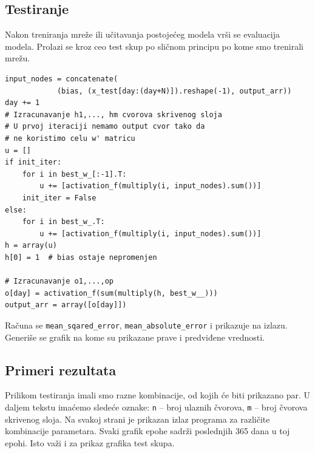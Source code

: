 \documentclass[a4paper]{article}
\begin{document}
\subsection{Testiranje}
Nakon treniranja mreže ili učitavanja postojećeg modela vrši se evaluacija modela. Prolazi se kroz ceo test skup po sličnom principu po kome smo trenirali mrežu.
\begin{verbatim}
input_nodes = concatenate(
            (bias, (x_test[day:(day+N)]).reshape(-1), output_arr))
day += 1
# Izracunavanje h1,..., hm cvorova skrivenog sloja
# U prvoj iteraciji nemamo output cvor tako da 
# ne koristimo celu w' matricu
u = []
if init_iter:
    for i in best_w_[:-1].T:
        u += [activation_f(multiply(i, input_nodes).sum())]
    init_iter = False
else:
    for i in best_w_.T:
        u += [activation_f(multiply(i, input_nodes).sum())]
h = array(u)
h[0] = 1  # bias ostaje nepromenjen

# Izracunavanje o1,...,op
o[day] = activation_f(sum(multiply(h, best_w__)))
output_arr = array([o[day]])
\end{verbatim}
Računa se \texttt{mean\_sqared\_error}, \texttt{mean\_absolute\_error} i prikazuje na izlazu. Generiše se grafik na kome su prikazane prave i predviđene vrednosti.

\subsection{Primeri rezultata}
Prilikom testiranja imali smo razne kombinacije, od kojih će biti prikazano par. U daljem tekstu imaćemo sledeće oznake: \texttt{n} -- broj ulaznih čvorova, \texttt{m} -- broj čvorova skrivenog sloja.
Na svakoj strani je prikazan izlaz programa za različite kombinacije parametara. Svaki grafik epohe sadrži poslednjih 365 dana u toj epohi. Isto važi i za prikaz grafika test skupa.

\pagebreak %
\end{document}
